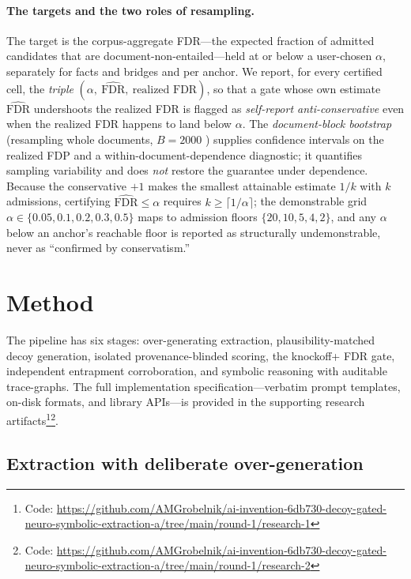\documentclass[11pt,letterpaper]{article}
\begin{document}
\paragraph{The targets and the two roles of resampling.} The target is the corpus-aggregate FDR---the expected fraction of admitted candidates that are document-non-entailed---held at or below a user-chosen $\alpha$, separately for facts and bridges and per anchor. We report, for every certified cell, the \emph{triple} $(\alpha,\ \widehat{\mathrm{FDR}},\ \text{realized FDR})$, so that a gate whose own estimate $\widehat{\mathrm{FDR}}$ undershoots the realized FDR is flagged as \emph{self-report anti-conservative} even when the realized FDR happens to land below $\alpha$. The \emph{document-block bootstrap} (resampling whole documents, $B = 2000$ \cite{Cameron2008}) supplies confidence intervals on the realized FDP and a within-document-dependence diagnostic; it quantifies sampling variability and does \emph{not} restore the guarantee under dependence. Because the conservative $+1$ makes the smallest attainable estimate $1/k$ with $k$ admissions, certifying $\widehat{\mathrm{FDR}}\le\alpha$ requires $k \ge \lceil 1/\alpha \rceil$; the demonstrable grid $\alpha\in\{0.05,0.1,0.2,0.3,0.5\}$ maps to admission floors $\{20,10,5,4,2\}$, and any $\alpha$ below an anchor's reachable floor is reported as structurally undemonstrable, never as ``confirmed by conservatism.''

\section{Method}

The pipeline has six stages: over-generating extraction, plausibility-matched decoy generation, isolated provenance-blinded scoring, the knockoff+ FDR gate, independent entrapment corroboration, and symbolic reasoning with auditable trace-graphs. The full implementation specification---verbatim prompt templates, on-disk formats, and library APIs---is provided in the supporting research artifacts\footnote{Code: \url{https://github.com/AMGrobelnik/ai-invention-6db730-decoy-gated-neuro-symbolic-extraction-a/tree/main/round-1/research-1}}\footnote{Code: \url{https://github.com/AMGrobelnik/ai-invention-6db730-decoy-gated-neuro-symbolic-extraction-a/tree/main/round-1/research-2}}.

\subsection{Extraction with deliberate over-generation}
\end{document}
